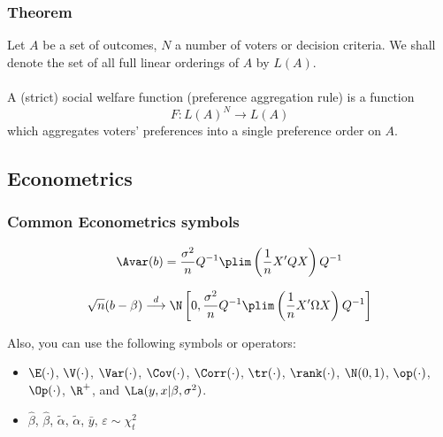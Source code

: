 \documentclass[aspectratio=169,xcolor=dvipsnames]{beamer}
\begin{document}

\begin{frame}
\frametitle{Theorem}
\begin{theorem}
Let $A$ be a set of outcomes, $N$ a number of voters or decision criteria. We shall denote the set of all full linear orderings of $A$ by $L(A)$.\\~\\

A (strict) social welfare function (preference aggregation rule) is a function
\begin{equation}
    F: L(A)^N \longrightarrow L(A)
\end{equation}
which aggregates voters' preferences into a single preference order on $A$.
\end{theorem}
\end{frame}


\subsection{Econometrics}


\begin{frame}
\frametitle{Common Econometrics symbols}

\begin{equation}
    \Avar (b) = \frac{\sigma^2}{n} Q^{-1} \plim \left( \frac{1}{n}X'QX \right)Q^{-1}
\end{equation}

\begin{equation}
    \sqrt{n}(b-\beta) \stackrel{d}{\longrightarrow} \N \left[0,\frac{\sigma^2}{n} Q^{-1} \plim \left( \frac{1}{n}X'\Omega X\right)Q^{-1}\right]
\end{equation}

Also, you can use the following symbols or operators:
\begin{itemize}
    \item $\E(\cdot)$, $\V(\cdot)$, $\Var(\cdot)$, $\Cov(\cdot)$, $\Corr(\cdot)$, $\tr(\cdot)$, $\rank(\cdot)$, $\N(0,1)$, $\op(\cdot)$, $\Op(\cdot)$, $\R^+$, and $\La(y,x|\beta,\sigma^2)$.
    \item $\hat \beta$, $\widehat \beta$, $\tilde \alpha$, $\widetilde \alpha$, $\bar y$, $\varepsilon \sim \chi^2_t$
\end{itemize}

\end{frame}
\end{document}
